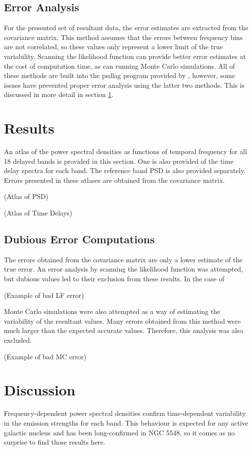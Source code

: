 \documentclass[11pt,letterpaper]{article}
\begin{document}
	\subsection{Error Analysis}
	For the presented set of resultant data, the error estimates are extracted from the covariance matrix. This method assumes that the errors between frequency bins are not correlated, so these values only represent a lower limit of the true variability. Scanning the likelihood function can provide better error estimates at the cost of computation time, as can running Monte Carlo simulations. All of these methods are built into the psdlag program provided by \cite{2013ApJ...777...24Z}, however, some issues have prevented proper error analysis using the latter two methods. This is discussed in more detail in section \ref{results}.

\section{Results}
\label{results}

An atlas of the power spectral densities as functions of temporal frequency for all 18 delayed bands is provided in this section. One is also provided of the time delay spectra for each band. The reference band PSD is also provided separately. Errors presented in these atlases are obtained from the covariance matrix.

(Atlas of PSD)

(Atlas of Time Delays)

	\subsection{Dubious Error Computations}
	The errors obtained from the covariance matrix are only a lower estimate of the true error. An error analysis by scanning the likelihood function was attempted, but dubious values led to their exclusion from these results. In the case of

	(Example of bad LF error)

	Monte Carlo simulations were also attempted as a way of estimating the variability of the resultant values. Many errors obtained from this method were much larger than the expected accurate values. Therefore, this analysis was also excluded.

	(Example of bad MC error)


\section{Discussion}
Frequency-dependent power spectral densities confirm time-dependent variability in the emission strengths for each band. This behaviour is expected for any active galactic nucleus and has been long-confirmed in NGC 5548, so it comes as no surprise to find those results here.
\end{document}
